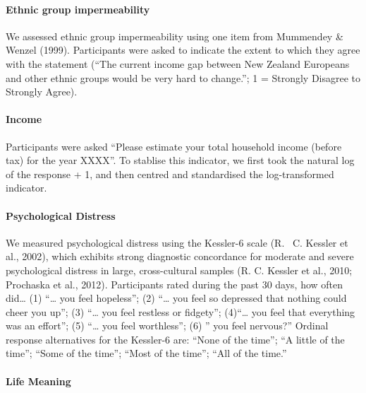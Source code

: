 \documentclass[
  letterpaper,
  DIV=11,
  numbers=noendperiod]{scrartcl}
\let\oldparagraph\paragraph
\renewcommand{\paragraph}[1]{\oldparagraph{#1}\mbox{}}
\begin{document}
\hypertarget{ethnic-group-impermeability}{%
\paragraph{Ethnic group
impermeability}\label{ethnic-group-impermeability}}

We assessed ethnic group impermeability using one item from Mummendey \&
Wenzel (1999). Participants were asked to indicate the extent to which
they agree with the statement (``The current income gap between New
Zealand Europeans and other ethnic groups would be very hard to
change.''; 1 = Strongly Disagree to Strongly Agree).

\hypertarget{income}{%
\paragraph{Income}\label{income}}

Participants were asked ``Please estimate your total household income
(before tax) for the year XXXX''. To stablise this indicator, we first
took the natural log of the response + 1, and then centred and
standardised the log-transformed indicator.

\hypertarget{psychological-distress}{%
\paragraph{Psychological Distress}\label{psychological-distress}}

We measured psychological distress using the Kessler-6 scale (R. ~C.
Kessler et al., 2002), which exhibits strong diagnostic concordance for
moderate and severe psychological distress in large, cross-cultural
samples (R. C. Kessler et al., 2010; Prochaska et al., 2012).
Participants rated during the past 30 days, how often did\ldots{} (1)
``\ldots{} you feel hopeless''; (2) ``\ldots{} you feel so depressed
that nothing could cheer you up''; (3) ``\ldots{} you feel restless or
fidgety''; (4)``\ldots{} you feel that everything was an effort''; (5)
``\ldots{} you feel worthless''; (6) '' you feel nervous?'' Ordinal
response alternatives for the Kessler-6 are: ``None of the time''; ``A
little of the time''; ``Some of the time''; ``Most of the time''; ``All
of the time.''

\hypertarget{life-meaning}{%
\paragraph{Life Meaning}\label{life-meaning}}
\end{document}
